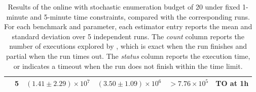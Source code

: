 \begin{table}[tbp]
\begin{tabular}{llcccc}
 & 5 & $(1.41 \pm 2.29) \times 10^{7}$ & $(3.50 \pm 1.09) \times 10^{6}$ & $>7.76 \times 10^{5}$ & TO at 1h  \\
\bottomrule
\end{tabular}
\vspace{7pt}
\caption{Results of the online \testor with stochastic enumeration budget of 20 under fixed 1-minute and 5-minute time constraints, compared with the corresponding \jmc runs. For each benchmark and parameter, each estimator entry reports the mean and standard deviation over 5 independent runs. The \jmc \textit{count} column reports the number of executions explored by \jmc, which is exact when the run finishes and partial when the run times out. The \jmc \textit{status} column reports the \jmc execution time, or indicates a timeout when the run does not finish within the time limit.}
\label{tab:online-estimator-results}
\end{table}
